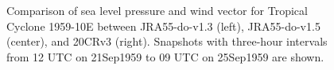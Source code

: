 \documentclass[dvipdfmx]{elsarticle_mod}
\begin{document}
\begin{figure}[h]
\centering
 \caption{Comparison of sea level pressure and wind vector for Tropical Cyclone 1959-10E between JRA55-do-v1.3 (left), JRA55-do-v1.5 (center), and 20CRv3 (right). Snapshots with three-hour intervals from 12 UTC on 21Sep1959 to 09 UTC on 25Sep1959 are shown.}
  \label{fig:1959-10E}
\end{figure}
\setcounter{figure}{9}
\end{document}
